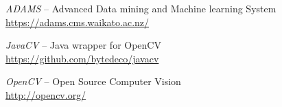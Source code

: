 %

\begin{thebibliography}{999}

		\textit{ADAMS} -- Advanced Data mining and Machine learning System \\
		\url{https://adams.cms.waikato.ac.nz/}{}

	 	\textit{JavaCV} -- Java wrapper for OpenCV \\
		\url{https://github.com/bytedeco/javacv}{}

		\textit{OpenCV} -- Open Source Computer Vision \\
		\url{http://opencv.org/}{}

\end{thebibliography}
